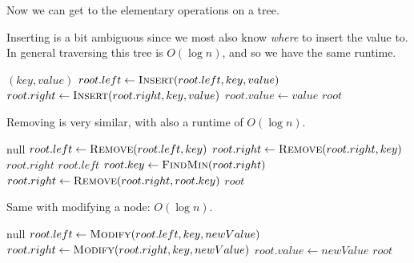   Now we can get to the elementary operations on a tree. 

  \begin{algo} 
    Inserting is a bit ambiguous since we most also know \textit{where} to insert the value to. In general traversing this tree is $O(\log{n})$, and so we have the same runtime. 
    \begin{algorithmic}[1]
        \State \Return {}$(key, value)$
      \EndIf
        \State $root.left \gets \Call{Insert}{root.left, key, value}$
        \State $root.right \gets \Call{Insert}{root.right, key, value}$
      \Else
        \State $root.value \gets value$ 
      \EndIf
      \State \Return $root$
    \EndProcedure
    \end{algorithmic}
  \end{algo}

  \begin{algo}
    Removing is very similar, with also a runtime of $O(\log{n})$. 
    \begin{algorithmic}[1]
        \State \Return $\text{null}$
      \EndIf
        \State $root.left \gets \Call{Remove}{root.left, key}$
        \State $root.right \gets \Call{Remove}{root.right, key}$
      \Else {}
          \State \Return $root.right$
          \State \Return $root.left$
        \EndIf
        \State $root.key \gets \Call{FindMin}{root.right}$
        \State $root.right \gets \Call{Remove}{root.right, root.key}$
      \EndIf
      \State \Return $root$
    \EndProcedure
    \end{algorithmic}
  \end{algo}

  \begin{algo}
    Same with modifying a node: $O(\log{n})$. 
    \begin{algorithmic}[1]
        \State \Return $\text{null}$ 
      \EndIf
        \State $root.left \gets \Call{Modify}{root.left, key, newValue}$
        \State $root.right \gets \Call{Modify}{root.right, key, newValue}$
      \Else
        \State $root.value \gets newValue$ 
      \EndIf
      \State \Return $root$
    \EndProcedure
    \end{algorithmic}
  \end{algo}

